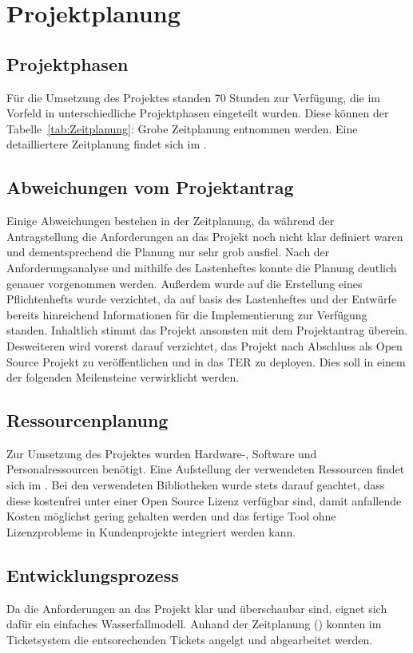 \section{Projektplanung} 
\label{sec:Projektplanung}


\subsection{Projektphasen}
\label{sec:Projektphasen}
Für die Umsetzung des Projektes standen 70 Stunden zur Verfügung, die im Vorfeld in unterschiedliche Projektphasen eingeteilt wurden. Diese können der Tabelle~\ref{tab:Zeitplanung}: Grobe Zeitplanung entnommen werden. Eine detailliertere Zeitplanung findet sich im . 



\subsection{Abweichungen vom Projektantrag}
\label{sec:AbweichungenProjektantrag} 

Einige Abweichungen bestehen in der Zeitplanung, da während der Antragstellung die Anforderungen an das Projekt noch nicht klar definiert waren und dementsprechend die Planung nur sehr grob ausfiel. Nach der Anforderungsanalyse und mithilfe des Lastenheftes konnte die Planung deutlich genauer vorgenommen werden. Außerdem wurde auf die Erstellung eines Pflichtenhefts wurde verzichtet, da auf basis des Lastenheftes und der Entwürfe bereits hinreichend Informationen für die Implementierung zur Verfügung standen. Inhaltlich stimmt das Projekt ansonsten mit dem Projektantrag überein. Desweiteren wird vorerst darauf verzichtet, das Projekt nach Abschluss als Open Source Projekt zu veröffentlichen und in das \ac{TER} zu deployen. Dies soll in einem der folgenden Meilensteine verwirklicht werden. 


\subsection{Ressourcenplanung}
\label{sec:Ressourcenplanung}

Zur Umsetzung des Projektes wurden Hardware-, Software und Personalressourcen benötigt. Eine Aufstellung der verwendeten Ressourcen findet sich im . Bei den verwendeten Bibliotheken wurde stets darauf geachtet, dass diese kostenfrei unter einer Open Source Lizenz verfügbar sind, damit anfallende Kosten möglichst gering gehalten werden und das fertige Tool ohne Lizenzprobleme in Kundenprojekte integriert werden kann.


\subsection{Entwicklungsprozess}
\label{sec:Entwicklungsprozess}

Da die Anforderungen an das Projekt klar und überschaubar sind, eignet sich dafür ein einfaches Wasserfallmodell. Anhand der Zeitplanung () konnten im Ticketsystem die entsorechenden Tickets angelgt und abgearbeitet werden.

